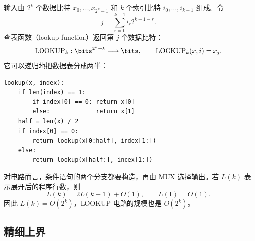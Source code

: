 \begin{example}[LOOKUP]
  \label{ex:lookup-circuit}
  输入由 $2^k$ 个数据比特
  $x_0,\ldots,x_{2^k-1}$ 和 $k$ 个索引比特
  $i_0,\ldots,i_{k-1}$ 组成。令
  \[
    j=\sum_{r=0}^{k-1}i_r2^{k-1-r}.
  \]
  查表函数（lookup function）返回第 $j$ 个数据比特：
  \[
    \operatorname{LOOKUP}_k:
    \bits^{2^k+k}\longrightarrow\bits,
    \qquad
    \operatorname{LOOKUP}_k(x,i)=x_j.
  \]
  它可以递归地把数据表分成两半：
\begin{verbatim}
lookup(x, index):
    if len(index) == 1:
        if index[0] == 0: return x[0]
        else:             return x[1]
    half = len(x) / 2
    if index[0] == 0:
        return lookup(x[0:half], index[1:])
    else:
        return lookup(x[half:], index[1:])
\end{verbatim}
  对电路而言，条件语句的两个分支都要构造，再由 MUX 选择输出。若
  $L(k)$ 表示展开后的程序行数，则
  \[
    L(k)=2L(k-1)+O(1),
    \qquad
    L(1)=O(1).
  \]
  因此 $L(k)=O(2^k)$，LOOKUP 电路的规模也是 $O(2^k)$。
\end{example}

\subsection{精细上界}

